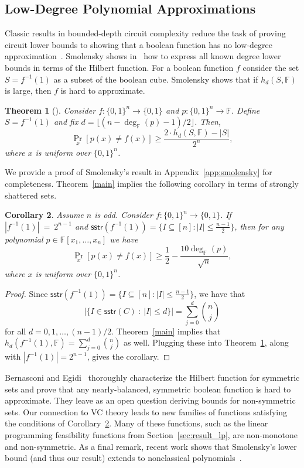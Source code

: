 \documentclass[11pt]{article}
\newtheorem{theorem}{Theorem}[section]
\newtheorem{corollary}[theorem]{Corollary}
\theoremstyle{definition}
\newcommand{\1}{\mathbf{1}}
\newcommand{\F}{{\mathbb F}}
\renewcommand{\leq}{\leqslant}
\renewcommand{\geq}{\geqslant}
\newcommand{\sstr}{\mathsf{sstr}}
\newcommand{\bitsz}{\{0,1\}^n}
\begin{document}
\noindent


\subsection{Low-Degree Polynomial Approximations}
Classic results in bounded-depth circuit complexity reduce the task of proving circuit lower bounds to showing that a boolean function has no low-degree approximation~\cite {razborov, smolensky87, abfr}.   
Smolensky shows in~\cite{smolensky} how to express all known degree lower bounds in terms of the Hilbert function.   For a boolean function $f$ consider the set $S = f^{-1}(1)$ as a subset of the boolean cube.  Smolensky shows that if $h_d(S,\F)$ is large, then $f$ is hard to approximate. 
\begin{theorem}[\cite{smolensky}]\label{smolensky} Consider $f:\bitsz \to \{0,1\}$ and $p:\{0,1\}^n \to\F$.  Define $S = f^{-1}(1)$ and fix $d = \lfloor (n-\deg_\F(p)-1)/2 \rfloor$.  Then,  
\[ \Pr_x[p(x) \neq f(x)]  \geq \frac{2\cdot h_d(S,\F) - |S|}{2^{n}},\] where $x$ is uniform over $\{0,1\}^n$.
\end{theorem}
\noindent
We provide a proof of Smolensky's result in Appendix~\ref{app:smolensky} for completeness.  Theorem~\ref{main} implies the following corollary in terms of strongly shattered sets. 

\begin{corollary}\label{sstr-bound} Assume $n$ is odd. Consider $f:\bitsz \to \{0,1\}$.  If $|f^{-1}(1)|~=~2^{n-1}$ and $\sstr(f^{-1}(1))=\{I\subseteq[n]:\lvert I\rvert\leq\frac{n-1}{2}\}$, then for any  polynomial $p \in \F[x_1,\ldots,x_{n}]$ we have 
\[ \Pr_x[p(x) \neq f(x)] \geq \frac{1}{2} - \frac{10\deg_\F(p)}{\sqrt{n}}, \]
where $x$ is uniform over $\{0,1\}^n$. 
\end{corollary}
\begin{proof}  Since $\sstr(f^{-1}(1))=\{I\subseteq[n]:\lvert I\rvert\leq\frac{n-1}{2}\}$, we have that \[ |\{ I \in \sstr(C)  \  :  \ |I| \leq d\}|  = \sum_{j=0}^d {n \choose j}\] for all $d = 0,1, \ldots, (n-1)/2$.   Theorem~\ref{main} implies that $h_d(f^{-1}(1),\F) = \sum_{j=0}^d {n \choose j}$  as well.  Plugging these into Theorem~\ref{smolensky}, along with $|f^{-1}(1)| = 2^{n-1}$, gives the corollary. \end{proof}

Bernasconi and Egidi~\cite{bernasconi} thoroughly characterize the Hilbert function for symmetric sets and prove that any nearly-balanced, symmetric boolean function is hard to approximate.  They leave as an open question deriving bounds for non-symmetric sets.   Our connection to VC  theory leads to new families of functions satisfying the conditions of Corollary~\ref{sstr-bound}.  Many of these functions, such as the linear programming feasibility functions from Section~\ref{sec:result_lp}, are non-monotone and non-symmetric. As a final remark, recent work shows that Smolensky's lower bound (and thus our result) extends  to nonclassical polynomials~\cite{nonclassical}.  
\end{document}
